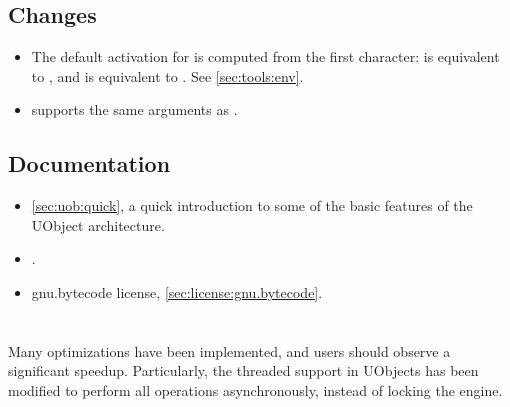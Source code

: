 \subsection{Changes}
\begin{itemize}
\item The default activation for  is computed from the
  first character:  is equivalent to
  , and  is equivalent to
  .  See \autoref{sec:tools:env}.
\item {} supports the same arguments as
  .
\end{itemize}

\subsection{Documentation}
\begin{itemize}
\item \autoref{sec:uob:quick}, a quick introduction to some of the basic
  features of the UObject architecture.
\item {}.
\item gnu.bytecode license, \autoref{sec:license:gnu.bytecode}.
\end{itemize}

\section{}

Many optimizations have been implemented, and users should observe a
significant speedup. Particularly, the threaded support in UObjects has been
modified to perform all operations asynchronously, instead of locking the
engine.

